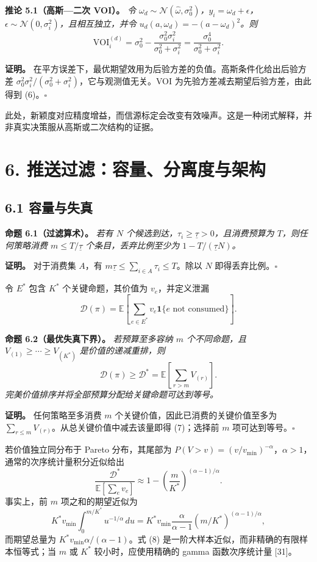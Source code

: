 \documentclass[
  chinese,
  11pt]{article}
\begin{document}
\textbf{推论 5.1（高斯---二次 VOI）。} \emph{令 \(\omega_d\sim\mathcal N(\hat\omega,\sigma_0^2)\)，\(y_i=\omega_d+\epsilon\)，\(\epsilon\sim\mathcal N(0,\sigma_i^2)\)，且相互独立，并令 \(u_d(a,\omega_d)=-(a-\omega_d)^2\)。则} \[
\mathrm{VOI}_i^{(d)}=\sigma_0^2-
\frac{\sigma_0^2\sigma_i^2}{\sigma_0^2+\sigma_i^2}
=\frac{\sigma_0^4}{\sigma_0^2+\sigma_i^2}.
\tag{6}
\]

\textbf{证明。} 在平方误差下，最优期望效用为后验方差的负值。高斯条件化给出后验方差 \(\sigma_0^2\sigma_i^2/(\sigma_0^2+\sigma_i^2)\)，它与观测值无关。VOI 为先验方差减去期望后验方差，由此得到 (6)。\(\square\)

此处，新颖度对应精度增益，而信源标定会改变有效噪声。这是一种闭式解释，并非真实决策服从高斯或二次结构的证据。

\section{6. 推送过滤：容量、分离度与架构}\label{ux63a8ux9001ux8fc7ux6ee4ux5bb9ux91cfux5206ux79bbux5ea6ux4e0eux67b6ux6784}

\subsection{6.1 容量与失真}\label{ux5bb9ux91cfux4e0eux5931ux771f}

\textbf{命题 6.1（过滤算术）。} \emph{若有 \(N\) 个候选到达，\(\tau_i\geq\underline\tau>0\)，且消费预算为 \(T\)，则任何策略消费 \(m\leq T/\underline\tau\) 个条目，丢弃比例至少为 \(1-T/(\underline\tau N)\)。}

\textbf{证明。} 对于消费集 \(A\)，有 \(m\underline\tau\leq\sum_{i\in A}\tau_i\leq T\)。除以 \(N\) 即得丢弃比例。\(\square\)

令 \(E^*\) 包含 \(K^*\) 个关键命题，其价值为 \(v_e\)，并定义泄漏 \[
\mathcal D(\pi)=\mathbb E\!\left[\sum_{e\in E^*}v_e\mathbf 1\{e\text{ not consumed}\}\right].
\]

\textbf{命题 6.2（最优失真下界）。} \emph{若预算至多容纳 \(m\) 个不同命题，且 \(V_{(1)}\geq\cdots\geq V_{(K^*)}\) 是价值的递减重排，则} \[
\mathcal D(\pi)\geq\mathcal D^*
=\mathbb E\!\left[\sum_{r>m}V_{(r)}\right].
\tag{7}
\] \emph{完美价值排序并将全部预算分配给关键命题可达到等号。}

\textbf{证明。} 任何策略至多消费 \(m\) 个关键价值，因此已消费的关键价值至多为 \(\sum_{r\leq m}V_{(r)}\)。从总关键价值中减去该量即得 (7)；选择前 \(m\) 项可达到等号。\(\square\)

若价值独立同分布于 Pareto 分布，其尾部为 \(P(V>v)=(v/v_{\min})^{-\alpha}\)，\(\alpha>1\)，通常的次序统计量积分近似给出 \[
\frac{\mathcal D^*}{\mathbb E[\sum_ev_e]}
\approx1-\left(\frac{m}{K^*}\right)^{(\alpha-1)/\alpha}.
\tag{8}
\] 事实上，前 \(m\) 项之和的期望近似为 \[
K^*v_{\min}\int_0^{m/K^*}u^{-1/\alpha}\,du
=K^*v_{\min}\frac{\alpha}{\alpha-1}(m/K^*)^{(\alpha-1)/\alpha},
\] 而期望总量为 \(K^*v_{\min}\alpha/(\alpha-1)\)。式 (8) 是一阶大样本近似，而非精确的有限样本恒等式；当 \(m\) 或 \(K^*\) 较小时，应使用精确的 gamma 函数次序统计量 {[}31{]}。
\end{document}
